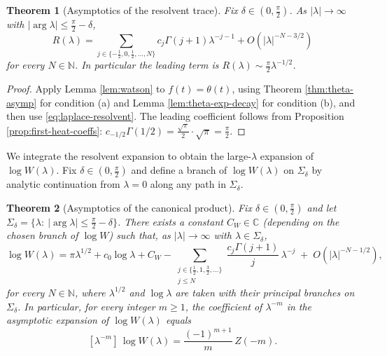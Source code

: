 \documentclass[11pt,letterpaper]{amsart}
\numberwithin{equation}{section}
\newtheorem{theorem}{Theorem}[section]
\theoremstyle{definition}
\newcommand{\C}{\mathbb{C}}
\newcommand{\N}{\mathbb{N}}
\begin{document}
\begin{theorem}[Asymptotics of the resolvent trace]\label{thm:resolvent-asymp}
Fix $\delta\in(0,\tfrac{\pi}{2})$.
As $|\lambda|\to\infty$ with $|\arg\lambda|\le \tfrac{\pi}{2}-\delta$,
\begin{equation}\label{eq:resolvent-asymp}
R(\lambda)=\sum_{j\in\{-\tfrac12,0,\tfrac12,\dots,N\}} c_j \Gamma(j+1)\lambda^{-j-1}+O(|\lambda|^{-N-3/2})
\end{equation}
for every $N\in\N$.
In particular the leading term is $R(\lambda)\sim \frac{\pi}{2}\lambda^{-1/2}$.
\end{theorem}

\begin{proof}
Apply Lemma \ref{lem:watson} to $f(t)=\theta(t)$, using Theorem \ref{thm:theta-asymp} for condition (a)
and Lemma \ref{lem:theta-exp-decay} for condition (b), and then use \eqref{eq:laplace-resolvent}.
The leading coefficient follows from Proposition \ref{prop:first-heat-coeffs}:
$c_{-1/2}\Gamma(1/2)=\frac{\sqrt{\pi}}{2}\cdot \sqrt{\pi}=\frac{\pi}{2}$.
\end{proof}

We integrate the resolvent expansion to obtain the large-$\lambda$ expansion of $\log W(\lambda)$.
Fix $\delta\in(0,\tfrac{\pi}{2})$ and define a branch of $\log W(\lambda)$ on $\Sigma_\delta$ by analytic continuation
from $\lambda=0$ along any path in $\Sigma_\delta$.

\begin{theorem}[Asymptotics of the canonical product]\label{thm:logW-asymp}
Fix $\delta\in(0,\tfrac{\pi}{2})$ and let $\Sigma_\delta=\{\lambda:\ |\arg\lambda|\le \tfrac{\pi}{2}-\delta\}$.
There exists a constant $C_W\in\C$ (depending on the chosen branch of $\log W$) such that, as $|\lambda|\to\infty$
with $\lambda\in\Sigma_\delta$,
\begin{equation}\label{eq:logW-asymp}
\log W(\lambda)
=
\pi \lambda^{1/2} + c_0\log\lambda + C_W
-\sum_{\substack{j\in\{\tfrac12,1,\tfrac32,\dots\}\\ j\le N}}\frac{c_j\Gamma(j+1)}{j}\,\lambda^{-j}
\;+\; O(|\lambda|^{-N-1/2}),
\end{equation}
for every $N\in\N$, where $\lambda^{1/2}$ and $\log\lambda$ are taken with their principal branches on $\Sigma_\delta$.
In particular, for every integer $m\ge 1$, the coefficient of $\lambda^{-m}$ in the asymptotic expansion of $\log W(\lambda)$ equals
\begin{equation}\label{eq:logW-integer-coeff}
[\lambda^{-m}]\,\log W(\lambda)=\frac{(-1)^{m+1}}{m}\,Z(-m).
\end{equation}
\end{theorem}
\end{document}
